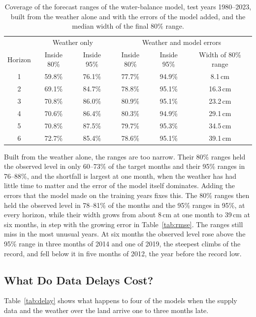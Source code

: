 \documentclass{article}
\begin{document}
\begin{table}[htbp]
\centering
\caption{Coverage of the forecast ranges of the water-balance model, test years 1980--2023, built
from the weather alone and with the errors of the model added, and the median width of the final
80\% range.}
\label{tab:coverage}
\small
\begin{tabular}{||c|c|c|c|c|c||}
\hline\hline
& \multicolumn{2}{c|}{Weather only} & \multicolumn{3}{c||}{Weather and model errors} \\
Horizon & Inside 80\% & Inside 95\% & Inside 80\% & Inside 95\% & Width of 80\% range \\
\hline\hline
1 & 59.8\% & 76.1\% & 77.7\% & 94.9\% & 8.1\,cm \\
2 & 69.1\% & 84.7\% & 78.8\% & 95.1\% & 16.3\,cm \\
3 & 70.8\% & 86.0\% & 80.9\% & 95.1\% & 23.2\,cm \\
4 & 70.6\% & 86.4\% & 80.3\% & 94.9\% & 29.1\,cm \\
5 & 70.8\% & 87.5\% & 79.7\% & 95.3\% & 34.5\,cm \\
6 & 72.7\% & 85.4\% & 78.6\% & 95.1\% & 39.1\,cm \\
\hline\hline
\end{tabular}
\end{table}

Built from the weather alone, the ranges are too narrow. Their 80\% ranges held the observed level
in only 60--73\% of the target months and their 95\% ranges in 76--88\%, and the shortfall is
largest at one month, when the weather has had little time to matter and the error of the model
itself dominates. Adding the errors that the model made on the training years fixes this. The 80\%
ranges then held the observed level in 78--81\% of the months and the 95\% ranges in 95\%, at
every horizon, while their width grows from about 8\,cm at one month to 39\,cm at six months, in
step with the growing error in Table~\ref{tab:rmse}. The ranges still miss in the most unusual
years. At six months the observed level rose above the 95\% range in three months of 2014 and one
of 2019, the steepest climbs of the record, and fell below it in five months of 2012, the year
before the record low.

\subsection{What Do Data Delays Cost?}
\label{sec:delayresult}

Table~\ref{tab:delay} shows what happens to four of the models when the supply data and the
weather over the land arrive one to three months late.
\end{document}
